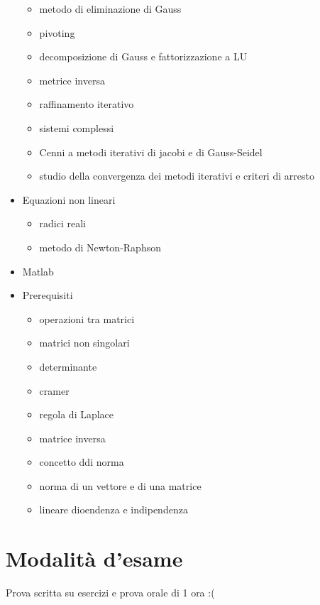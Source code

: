 \begin{itemize}
\begin{itemize}
    \item metodo di eliminazione di Gauss
    \item pivoting
    \item decomposizione di Gauss e fattorizzazione a LU
    \item metrice inversa
    \item raffinamento iterativo
    \item sistemi complessi
    \item Cenni a metodi iterativi di jacobi e di Gauss-Seidel
    \item studio della convergenza dei metodi iterativi e criteri di arresto
  \end{itemize}
  \item Equazioni non lineari
  \begin{itemize}
    \item radici reali
    \item metodo di Newton-Raphson
  \end{itemize}
  \item Matlab
  \item Prerequisiti
  \begin{itemize}
    \item operazioni tra matrici
    \item matrici non singolari
    \item determinante
    \item cramer
    \item regola di Laplace
    \item matrice inversa
    \item concetto ddi norma
    \item norma di un vettore e di una matrice
    \item lineare dioendenza e indipendenza
  \end{itemize}
\end{itemize}
\section{Modalità d'esame}
Prova scritta su esercizi e prova orale di 1 ora :(
